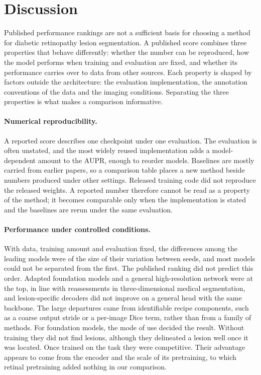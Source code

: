 \section{Discussion}

Published performance rankings are not a sufficient basis for choosing a method for diabetic retinopathy lesion segmentation. A published score combines three properties that behave differently: whether the number can be reproduced, how the model performs when training and evaluation are fixed, and whether its performance carries over to data from other sources. Each property is shaped by factors outside the architecture: the evaluation implementation, the annotation conventions of the data and the imaging conditions. Separating the three properties is what makes a comparison informative.

\paragraph{Numerical reproducibility.} A reported score describes one checkpoint under one evaluation. The evaluation is often unstated, and the most widely reused implementation adds a model-dependent amount to the AUPR, enough to reorder models. Baselines are mostly carried from earlier papers, so a comparison table places a new method beside numbers produced under other settings. Released training code did not reproduce the released weights. A reported number therefore cannot be read as a property of the method; it becomes comparable only when the implementation is stated and the baselines are rerun under the same evaluation.

\paragraph{Performance under controlled conditions.} With data, training amount and evaluation fixed, the differences among the leading models were of the size of their variation between seeds, and most models could not be separated from the first. The published ranking did not predict this order. Adapted foundation models and a general high-resolution network were at the top, in line with reassessments in three-dimensional medical segmentation\cite{isensee2024revisited}, and lesion-specific decoders did not improve on a general head with the same backbone. The large departures came from identifiable recipe components, such as a coarse output stride or a per-image Dice term, rather than from a family of methods. For foundation models, the mode of use decided the result. Without training they did not find lesions, although they delineated a lesion well once it was located. Once trained on the task they were competitive. Their advantage appears to come from the encoder and the scale of its pretraining, to which retinal pretraining added nothing in our comparison.

